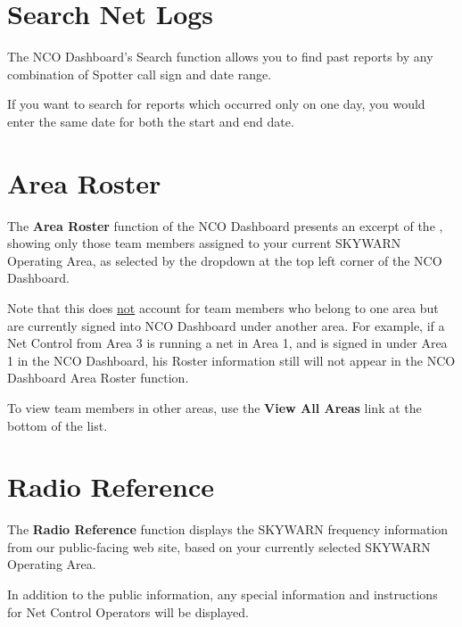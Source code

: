 \documentclass[pdflatex,letterpaper,twoside,12pt]{book}
\begin{document}

\section{Search Net Logs}\label{dash-search-logs}

The NCO Dashboard's Search function allows you to find past reports by any combination of Spotter call sign and date range.

If you want to search for reports which occurred only on one day, you would enter the same date for both the start and end date.


\section{Area Roster}\label{dash-area-roster}

The \textbf{Area Roster} function of the NCO Dashboard presents an excerpt of the , showing only those team members assigned to your current SKYWARN Operating Area, as selected by the dropdown at the top left corner of the NCO Dashboard.

Note that this does \underline{not} account for team members who belong to one area but are currently signed into NCO Dashboard under another area.  For example, if a Net Control from Area 3 is running a net in Area 1, and is signed in under Area 1 in the NCO Dashboard, his Roster information still will not appear in the NCO Dashboard Area Roster function.

To view team members in other areas, use the \textbf{View All Areas} link at the bottom of the list.


\section{Radio Reference}\label{dash-radio-ref}

The \textbf{Radio Reference} function displays the SKYWARN frequency information from our public-facing web site, based on your currently selected SKYWARN Operating Area.

In addition to the public information, any special information and instructions for Net Control Operators will be displayed.
\end{document}
